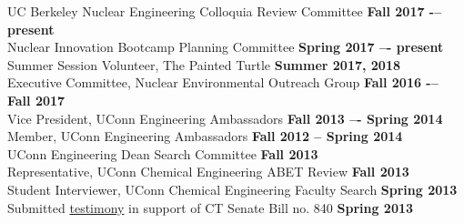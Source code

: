\documentclass[margin,line]{resume}
\begin{document}
\begin{resume}
UC Berkeley Nuclear Engineering Colloquia Review Committee 
    \hfill \textbf{Fall 2017 -– present} \\
Nuclear Innovation Bootcamp Planning Committee	
    \hfill \textbf{Spring 2017 –- present} \\
Summer Session Volunteer, The Painted Turtle
    \hfill \textbf{Summer 2017, 2018} \\
Executive Committee, Nuclear Environmental Outreach Group
    \hfill \textbf{Fall 2016 -– Fall 2017} \\
Vice President, UConn Engineering Ambassadors
    \hfill \textbf{Fall 2013 –- Spring 2014} \\
Member, UConn Engineering Ambassadors
    \hfill \textbf{Fall 2012 – Spring 2014} \\
UConn Engineering Dean Search Committee
    \hfill \textbf{Fall 2013} \\
Representative, UConn Chemical Engineering ABET Review
    \hfill \textbf{Fall 2013} \\
Student Interviewer, UConn Chemical Engineering Faculty Search
    \hfill \textbf{Spring 2013} \\
Submitted \hyperlink{https://www.cga.ct.gov/2013/FINdata/Tmy/2013SB-00840-R000304-Milos\%20Atz,\%20Student,\%20UConn-TMY.PDF}{testimony} in support of CT Senate Bill no. 840
    \hfill \textbf{Spring 2013} \\ %


\end{resume}
\end{document}
